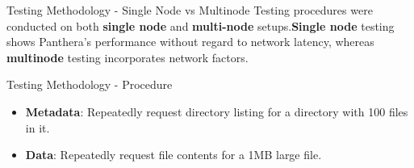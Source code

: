\documentclass[final]{beamer} %
\begin{document}
\begin{frame}
\begin{columns}[t]
\begin{column}{0.32\textwidth}
      
	\begin{block}{Testing Methodology - Single Node vs Multinode}
	Testing procedures were conducted on both \textbf{single node} and \textbf{multi-node} setups.\textbf{Single node} testing shows Panthera's performance without regard to network latency, whereas \textbf{multinode} testing incorporates network factors.
	\end{block}
	
	\begin{block}{Testing Methodology - Procedure}
	\begin{itemize}
		\item \textbf{Metadata}: Repeatedly request directory listing for a directory with 100 files in it.
		\item \textbf{Data}: Repeatedly request file contents for a 1MB large file.
	\end{itemize}
	\end{block}


\end{column}
\end{columns}
\end{frame}
\end{document}
